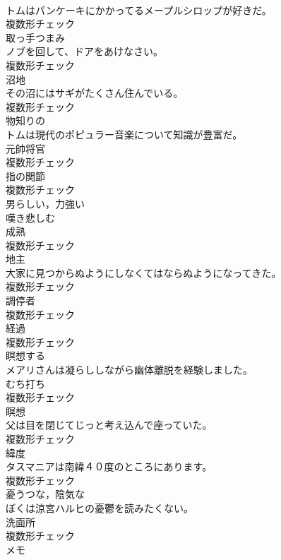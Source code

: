 \documentclass[8pt]{extreport}
\begin{document}
\begin{CJK}{UTF8}{min}
\\	トムはパンケーキにかかってるメープルシロップが好きだ。	
\\	複数形チェック
\\	[名詞]	取っ手つまみ	
\\	ノブを回して、ドアをあけなさい。	
\\	複数形チェック
\\	[名詞]	沼地	
\\	その沼にはサギがたくさん住んでいる。	
\\	複数形チェック
\\	[形容詞]	物知りの	
\\	トムは現代のポピュラー音楽について知識が豊富だ。	
\\	[名詞]	元帥将官	
\\	複数形チェック
\\	[名詞]	指の関節	
\\	複数形チェック
\\	[形容詞]	男らしい，力強い	
\\	[形容詞]	嘆き悲しむ	
\\	[名詞]	成熟	
\\	複数形チェック
\\	[名詞]	地主	
\\	大家に見つからぬようにしなくてはならぬようになってきた。	
\\	複数形チェック
\\	[名詞]	調停者	
\\	複数形チェック
\\	[名詞]	経過	
\\	複数形チェック
\\	[動詞]	瞑想する	
\\	メアリさんは凝らししながら幽体離脱を経験しました。	
\\	[名詞]	むち打ち	
\\	複数形チェック
\\	[名詞]	瞑想	
\\	父は目を閉じてじっと考え込んで座っていた。	
\\	複数形チェック
\\	[名詞]	緯度	
\\	タスマニアは南緯４０度のところにあります。	
\\	複数形チェック
\\	[形容詞]	憂うつな，陰気な	
\\	ぼくは涼宮ハルヒの憂鬱を読みたくない。	
\\	[名詞]	洗面所	
\\	複数形チェック
\\	[名詞]	メモ	

\end{CJK}
\end{document}
